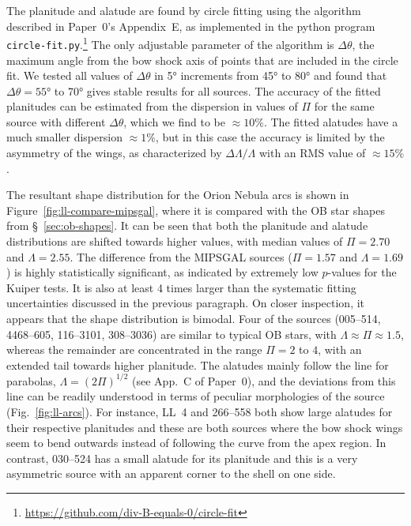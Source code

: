 \documentclass[useAMS, usenatbib, a4paper]{mnras}
\begin{document}
The planitude and alatude are found by circle fitting using the
algorithm described in Paper~0's Appendix~E, as implemented in the
python program
\texttt{circle-fit.py}.\footnote{\url{https://github.com/div-B-equals-0/circle-fit}}
The only adjustable parameter of the algorithm is \(\Delta\theta\), the maximum
angle from the bow shock axis of points that are included in the
circle fit.  We tested all values of \(\Delta\theta\) in \ang{5} increments from
\ang{45} to \ang{80} and found that \(\Delta\theta = \ang{55}\) to \ang{70}
gives stable results for all sources.  The accuracy of the fitted
planitudes can be estimated from the dispersion in values of \(\Pi\) for
the same source with different \(\Delta\theta\), which we find to be
\(\approx 10\%\).  The fitted alatudes have a much smaller dispersion
\(\approx 1 \%\), but in this case the accuracy is limited by the asymmetry
of the wings, as characterized by \(\Delta\Lambda/\Lambda\) with an RMS value of
\(\approx 15\%\).

The resultant shape distribution for the Orion Nebula arcs is shown in
Figure~\ref{fig:ll-compare-mipsgal}, where it is compared with the OB
star shapes from \S~\ref{sec:ob-shapes}.  It can be seen that both the
planitude and alatude distributions are shifted towards higher values,
with median values of \(\Pi = 2.70\) and \(\Lambda = 2.55\).  The difference
from the MIPSGAL sources (\(\Pi = 1.57\) and \(\Lambda = 1.69\)) is highly
statistically significant, as indicated by extremely low \(p\)-values
for the Kuiper tests.  It is also at least 4 times larger
than the systematic fitting uncertainties discussed in the previous
paragraph.  On closer inspection, it appears that the shape
distribution is bimodal.  Four of the sources (005--514, 4468--605,
116--3101, 308--3036) are similar to typical OB stars, with
\(\Lambda \approx \Pi \approx 1.5\), whereas the remainder are concentrated in the range
\(\Pi = 2\) to \(4\), with an extended tail towards higher planitude.
The alatudes mainly follow the line for parabolas,
\(\Lambda = (2\Pi)^{1/2}\) (see App.~C of Paper~0), and the deviations from
this line can be readily understood in terms of peculiar morphologies
of the source (Fig.~\ref{fig:ll-arcs}).  For instance, LL~4 and
266--558 both show large alatudes for their respective planitudes and
these are both sources where the bow shock wings seem to bend outwards
instead of following the curve from the apex region.  In contrast,
030--524 has a small alatude for its planitude and this is a very
asymmetric source with an apparent corner to the shell on one side.
\end{document}
